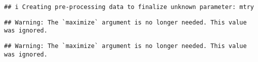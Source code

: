 \documentclass[
]{article}
\newenvironment{Shaded}{\begin{snugshade}}{\end{snugshade}}
\newcommand{\DataTypeTok}[1]{\textcolor[rgb]{0.13,0.29,0.53}{#1}}
\newcommand{\KeywordTok}[1]{\textcolor[rgb]{0.13,0.29,0.53}{\textbf{#1}}}
\newcommand{\NormalTok}[1]{#1}
\newcommand{\OperatorTok}[1]{\textcolor[rgb]{0.81,0.36,0.00}{\textbf{#1}}}
\newcommand{\OtherTok}[1]{\textcolor[rgb]{0.56,0.35,0.01}{#1}}
\newcommand{\StringTok}[1]{\textcolor[rgb]{0.31,0.60,0.02}{#1}}
\begin{document}
\begin{verbatim}
## i Creating pre-processing data to finalize unknown parameter: mtry
\end{verbatim}

\begin{Shaded}
\end{Shaded}

\begin{verbatim}
## Warning: The `maximize` argument is no longer needed. This value was ignored.
\end{verbatim}

\begin{Shaded}
\end{Shaded}

\begin{verbatim}
## Warning: The `maximize` argument is no longer needed. This value was ignored.
\end{verbatim}
\end{document}
